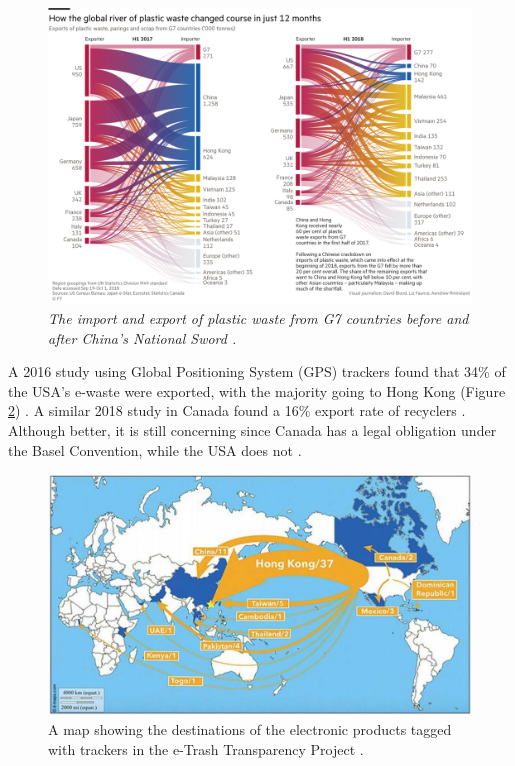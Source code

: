 \documentclass{article}
\begin{document}
\begin{figure}[h]
    \includegraphics[width=.95 \textwidth]{./images/e-waste_china_import.png}
    \centering
    \caption{\textit{The import and export of plastic waste from G7 countries before and after China's National Sword \cite{financialtimes2018nationalsword}.}}
    \label{e-waste_china_import}
\end{figure}

A 2016 study using Global Positioning System (GPS) trackers found that 34\% of the USA's e-waste were exported, with the majority going to Hong Kong (Figure \ref{US_export_e-waste}) \cite{ban2016usrecyclingexport}. A similar 2018 study in Canada found a 16\% export rate of recyclers \cite{ban2018carecyclingexport}. Although better, it is still concerning since Canada has a legal obligation under the Basel Convention, while the USA does not \cite{baselconvention2011ratify}. 

\begin{figure}[h]
    \includegraphics[width=.8 \textwidth]{./images/US_export_e-waste.png}
    \centering
    \caption{A map showing the destinations of the electronic products tagged with trackers in the e-Trash Transparency Project \cite{ban2016usrecyclingexport}.}
    \label{US_export_e-waste}
\end{figure}
\end{document}
